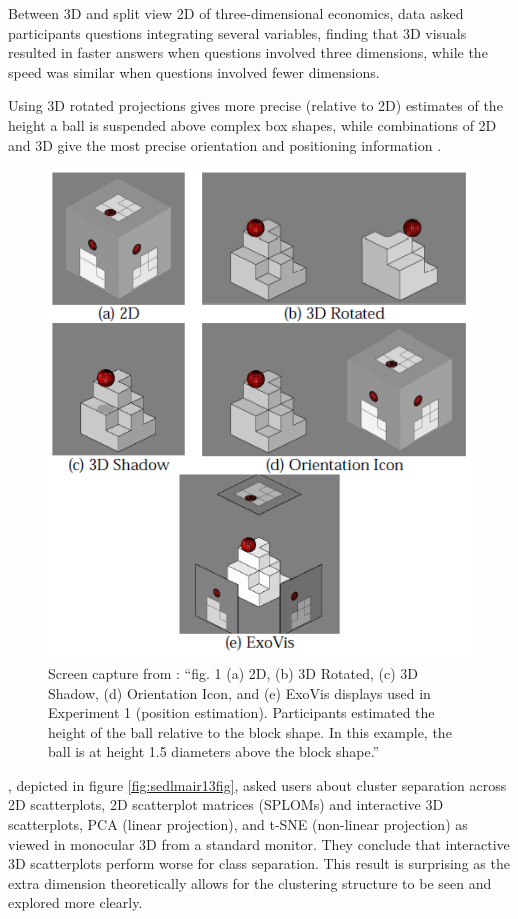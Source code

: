 \documentclass{monashthesis}
\begin{document}
Between 3D and split view 2D of three-dimensional economics, data
\textcite{wickens_implications_1994} asked participants questions
integrating several variables, finding that 3D visuals resulted in
faster answers when questions involved three dimensions, while the speed
was similar when questions involved fewer dimensions.

Using 3D rotated projections gives more precise (relative to 2D)
estimates of the height a ball is suspended above complex box shapes,
while combinations of 2D and 3D give the most precise orientation and
positioning information \autocite[depicted in figure
\ref{fig:tory06fig}]{tory_visualization_2006}.








\begin{figure}

{\centering \includegraphics[width=0.5\linewidth]{./figures/tory06fig} 

}

\caption{Screen capture from
\textcite{tory_visualization_2006}: ``fig. 1 (a) 2D, (b) 3D Rotated, (c)
3D Shadow, (d) Orientation Icon, and (e) ExoVis displays used in
Experiment 1 (position estimation). Participants estimated the height of
the ball relative to the block shape. In this example, the ball is at
height 1.5 diameters above the block shape.''}\label{fig:tory06fig}
\end{figure}

\textcite{sedlmair_empirical_2013}, depicted in figure
\ref{fig:sedlmair13fig}, asked users about cluster separation across 2D
scatterplots, 2D scatterplot matrices (SPLOMs) and interactive 3D
scatterplots, PCA (linear projection), and t-SNE (non-linear projection)
as viewed in monocular 3D from a standard monitor. They conclude that
interactive 3D scatterplots perform worse for class separation. This
result is surprising as the extra dimension theoretically allows for the
clustering structure to be seen and explored more clearly.
\end{document}
